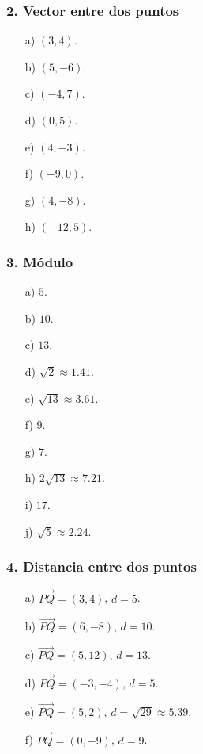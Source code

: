 \subsubsection*{2. Vector entre dos puntos}
\begin{enumerate}
    \item[a)] $(3,4)$.
    \item[b)] $(5,-6)$.
    \item[c)] $(-4,7)$.
    \item[d)] $(0,5)$.
    \item[e)] $(4,-3)$.
    \item[f)] $(-9,0)$.
    \item[g)] $(4,-8)$.
    \item[h)] $(-12,5)$.
\end{enumerate}

\subsubsection*{3. Módulo}
\begin{enumerate}
    \item[a)] $5$.
    \item[b)] $10$.
    \item[c)] $13$.
    \item[d)] $\sqrt{2}\approx1.41$.
    \item[e)] $\sqrt{13}\approx3.61$.
    \item[f)] $9$.
    \item[g)] $7$.
    \item[h)] $2\sqrt{13}\approx7.21$.
    \item[i)] $17$.
    \item[j)] $\sqrt{5}\approx2.24$.
\end{enumerate}

\subsubsection*{4. Distancia entre dos puntos}
\begin{enumerate}
    \item[a)] $\overrightarrow{PQ}=(3,4)$, $d=5$.
    \item[b)] $\overrightarrow{PQ}=(6,-8)$, $d=10$.
    \item[c)] $\overrightarrow{PQ}=(5,12)$, $d=13$.
    \item[d)] $\overrightarrow{PQ}=(-3,-4)$, $d=5$.
    \item[e)] $\overrightarrow{PQ}=(5,2)$, $d=\sqrt{29}\approx5.39$.
    \item[f)] $\overrightarrow{PQ}=(0,-9)$, $d=9$.
\end{enumerate}


